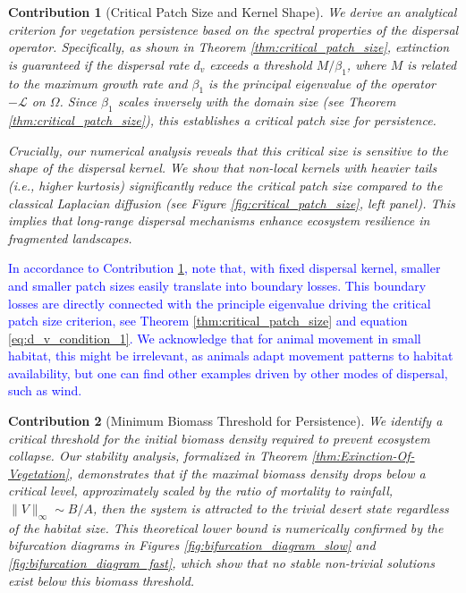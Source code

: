 \documentclass[11pt, a4paper]{article}
\theoremstyle{break}
\theoremstyle{break}
\theoremstyle{break}
\theoremstyle{break}
\theoremstyle{break}
\theoremstyle{break}
\theoremstyle{break}
\theoremstyle{break}
\theoremstyle{break}
\theoremstyle{break}
\newtheorem{main_contrib}{Contribution}
\begin{document}
\begin{main_contrib}[Critical Patch Size and Kernel Shape]
\label{contrib:main_contrib_cps_ks}
We derive an analytical criterion for vegetation persistence based on the spectral properties of the dispersal operator. Specifically, as shown in Theorem \ref{thm:critical_patch_size}, extinction is guaranteed if the dispersal rate $d_v$ exceeds a threshold $M/\beta_1$, where $M$ is related to the maximum growth rate and $\beta_1$ is the principal eigenvalue of the operator $-\mathcal{L}$ on $\Omega$. Since $\beta_1$ scales inversely with the domain size (see Theorem \ref{thm:critical_patch_size}), this establishes a \textit{critical patch size} for persistence. 

Crucially, our numerical analysis reveals that this critical size is sensitive to the shape of the dispersal kernel. We show that non-local kernels with heavier tails (i.e., higher kurtosis) significantly reduce the critical patch size compared to the classical Laplacian diffusion (see Figure \ref{fig:critical_patch_size}, left panel). This implies that long-range dispersal mechanisms enhance ecosystem resilience in fragmented landscapes.
\end{main_contrib}

\textcolor{blue}{In accordance to Contribution \ref{contrib:main_contrib_cps_ks}, note that, with fixed dispersal kernel, smaller and smaller patch sizes easily translate into boundary losses. This boundary losses are directly connected with the principle eigenvalue driving the critical patch size criterion, see Theorem \ref{thm:critical_patch_size} and equation \eqref{eq:d_v_condition_1}. We acknowledge that for animal movement in small habitat, this might be irrelevant, as animals adapt movement patterns to habitat availability, but one can find other examples driven by other modes of dispersal, such as wind.}

\begin{main_contrib}[Minimum Biomass Threshold for Persistence]
We identify a critical threshold for the initial biomass density required to prevent ecosystem collapse. Our stability analysis, formalized in Theorem \ref{thm:Exinction-Of-Vegetation}, demonstrates that if the maximal biomass density drops below a critical level, approximately scaled by the ratio of mortality to rainfall, $\|V\|_\infty \sim B/A$, then the system is attracted to the trivial desert state regardless of the habitat size. This theoretical lower bound is numerically confirmed by the bifurcation diagrams in Figures \ref{fig:bifurcation_diagram_slow} and \ref{fig:bifurcation_diagram_fast}, which show that no stable non-trivial solutions exist below this biomass threshold.
\end{main_contrib}
\end{document}

